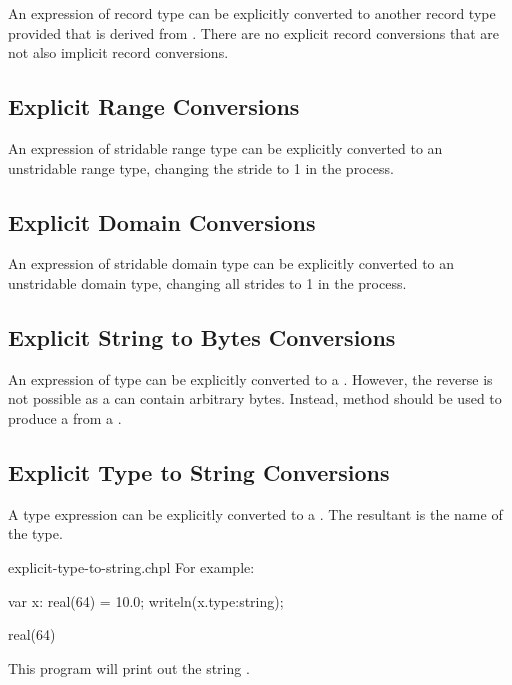An expression of record type  can be explicitly converted to
another record type  provided that  is derived
from .  There are no explicit record conversions that are not
also implicit record conversions.

\subsection{Explicit Range Conversions}
\label{Explicit_Range_Conversions}

An expression of stridable range type can be explicitly converted
to an unstridable range type, changing the stride to 1 in the process.

\subsection{Explicit Domain Conversions}
\label{Explicit_Domain_Conversions}

An expression of stridable domain type can be explicitly converted
to an unstridable domain type, changing all strides to 1 in the process.

\subsection{Explicit String to Bytes Conversions}
\label{Explicit_String_to_Bytes_Conversions}

An expression of  type can be explicitly converted to a
. However, the reverse is not possible as a  can contain
arbitrary bytes. Instead,  method should be used to produce
a  from a .

\subsection{Explicit Type to String Conversions}
\label{Explicit_Type_to_String_Conversions}

A type expression can be explicitly converted to a . The resultant
 is the name of the type.

\begin{chapelexample}{explicit-type-to-string.chpl}
For example:
\begin{chapel}
var x: real(64) = 10.0;
writeln(x.type:string);
\end{chapel}
\begin{chapeloutput}
real(64)
\end{chapeloutput}
This program will print out the string .
\end{chapelexample}
